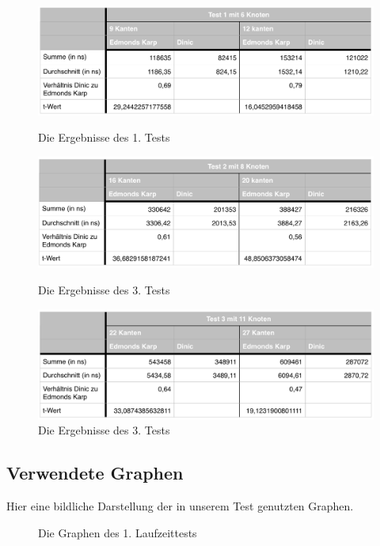 \documentclass[a4paper]{llncs}
\begin{document}
\citep{t-test}

\begin{figure}[H]
    \includegraphics[scale=0.55]{ergebnisse1} 
\caption{Die Ergebnisse des 1. Tests} 
\label{fig:ergebnisstabelle1}
    \includegraphics[scale=0.55]{ergebnisse2} 
\caption{Die Ergebnisse des 3. Tests} 
\label{fig:ergebnisstabelle2}
    \includegraphics[scale=0.55]{ergebnisse3} 
\caption{Die Ergebnisse des 3. Tests} 
\label{fig:ergebnisstabelle3}
\end{figure}

\subsection{Verwendete Graphen}
Hier eine bildliche Darstellung der in unserem Test genutzten Graphen.

\begin{figure}[H]
\label{fig:testgraph1}
\caption{Die Graphen des 1. Laufzeittests} 
\end{figure}
\end{document}
